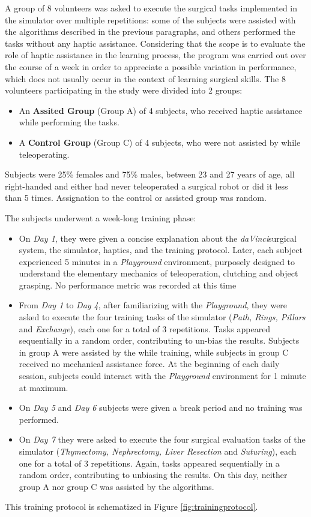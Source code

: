 \documentclass[../main.tex]{subfiles}
\begin{document}
A group of 8 volunteers was asked to execute the surgical tasks implemented in the simulator over multiple repetitions: some of the subjects were assisted with the \vf algorithms described in the previous paragraphs, and others performed the tasks without any haptic assistance. Considering that the scope is to evaluate the role of haptic assistance in the learning process, the program was carried out over the course of a week in order to appreciate a possible variation in performance, which does not usually occur in the context of learning surgical skills.
The 8 volunteers participating in the study were divided into 2 groups:
\begin{itemize}
    \item An \textbf{Assited Group} (Group A) of 4 subjects, who received haptic assistance while performing the tasks.
    \item A \textbf{Control Group} (Group C) of 4 subjects, who were not assisted by \vfs while teleoperating.
\end{itemize}

Subjects were 25\% females and 75\% males, between 23 and 27 years of age, all right-handed and either had never teleoperated a surgical robot or did it less than 5 times. Assignation to the control or assisted group was random.

The subjects underwent a week-long training phase:
\begin{itemize}
  \item On \textit{Day 1}, they were given a concise explanation about the \textit{daVinci}\cright surgical system, the simulator, haptics, and the training protocol. Later, each subject experienced 5 minutes in a \textit{Playground} environment, purposely designed to understand the elementary mechanics of teleoperation, clutching and object grasping. No performance metric was recorded at this time
  \item From \textit{Day 1} to \textit{Day 4}, after familiarizing with the \textit{Playground}, they were asked to execute the four training tasks of the simulator (\textit{Path, Rings, Pillars} and \textit{Exchange}), each one for a total of 3 repetitions. Tasks appeared sequentially in a random order, contributing to un-bias the results. Subjects in group A were assisted by the \vfs while training, while subjects in group C received no mechanical assistance force. At the beginning of each daily session, subjects could interact with the \textit{Playground} environment for 1 minute at maximum.  
  \item On \textit{Day 5} and \textit{Day 6} subjects were given a break period and no training was performed.
  \item On \textit{Day 7} they were asked to execute the four surgical evaluation tasks of the simulator (\textit{Thymectomy, Nephrectomy, Liver Resection} and \textit{Suturing}), each one for a total of 3 repetitions. Again, tasks appeared sequentially in a random order, contributing to unbiasing the results. On this day, neither group A nor group C was assisted by the \vf algorithms.
\end{itemize}
This training protocol is schematized in Figure \ref{fig:trainingprotocol}. 
\end{document}
